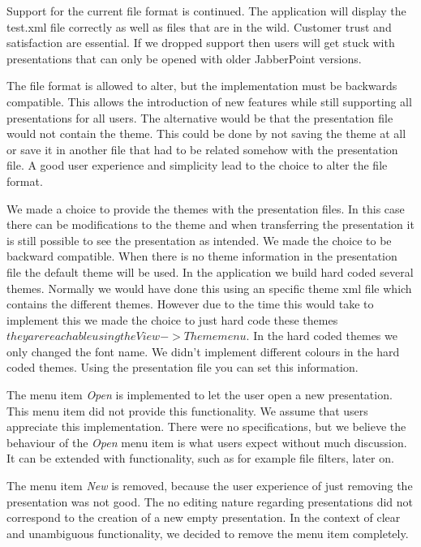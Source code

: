 \documentclass[a4paper]{article}
\begin{document}
Support for the current file format is continued. The application will display the test.xml file correctly as well as files that are in the wild. Customer trust and satisfaction are essential. If we dropped support then users will get stuck with presentations that can only be opened with older JabberPoint versions.
 
The file format is allowed to alter, but the implementation must be backwards compatible. This allows the introduction of new features while still supporting all presentations for all users. The alternative would be that the presentation file would not contain the theme. This could be done by not saving the theme at all or save it in another file that had to be related somehow with the presentation file. A good user experience and simplicity lead to the choice to alter the file format.

We made a choice to provide the themes with the presentation files. In this case there can be modifications to the theme and when transferring the presentation it is still possible to see the presentation as intended. We made the choice to be backward compatible. When there is no theme information in the presentation file the default theme will be used. In the application we build hard coded several themes. Normally we would have done this using an specific theme xml file which contains the different themes. However due to the time this would take to implement this we made the choice to just hard code these themes \(they are reachable using the View->Theme menu. \) In the hard coded themes we only changed the font name. We didn't implement different colours in the hard coded themes. Using the presentation file you can set this information.

The menu item \textit{Open} is implemented to let the user open a new presentation. This menu item did not provide this functionality. We assume that users appreciate this implementation. There were no specifications, but we believe the behaviour of the \textit{Open} menu item is what users expect without much discussion. It can be extended with functionality, such as for example file filters, later on.

The menu item \textit{New} is removed, because the user experience of just removing the presentation was not good. The no editing nature regarding presentations did not correspond to the creation of a new empty presentation. In the context of clear and unambiguous functionality, we decided to remove the menu item completely.
\end{document}
